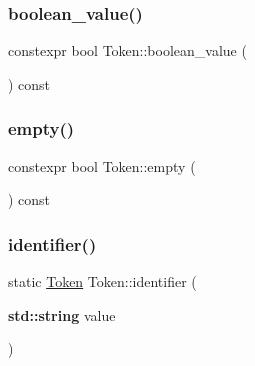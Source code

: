 \mbox{\label{class_token_a72e4ccf32f393af43e08e7ff04e45f95}} 
\subsubsection{\texorpdfstring{boolean\+\_\+value()}{boolean\_value()}}
{\footnotesize\ttfamily constexpr bool Token\+::boolean\+\_\+value (\begin{DoxyParamCaption}{ }\end{DoxyParamCaption}) const\hspace{0.3cm}{\ttfamily [inline]}}

\mbox{\label{class_token_aaed20163d2aee9be88f80f28ba7f9200}} 
\subsubsection{\texorpdfstring{empty()}{empty()}}
{\footnotesize\ttfamily constexpr bool Token\+::empty (\begin{DoxyParamCaption}{ }\end{DoxyParamCaption}) const\hspace{0.3cm}{\ttfamily [inline]}}

\mbox{\label{class_token_a8ec1ef00a7536071616efab63833c970}} 
\subsubsection{\texorpdfstring{identifier()}{identifier()}\hspace{0.1cm}{\footnotesize\ttfamily [1/3]}}
{\footnotesize\ttfamily static \hyperlink{class_token}{Token} Token\+::identifier (\begin{DoxyParamCaption}\item[{\textbf{ std\+::string}}]{value }\end{DoxyParamCaption})\hspace{0.3cm}{\ttfamily [static]}}

\mbox{\label{class_token_af8cc69259b72cb8fb6f86da202564f15}} 
